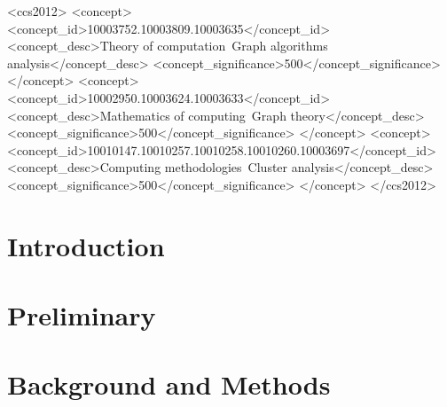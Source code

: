 \documentclass[sigconf,review]{acmart}
\begin{document}
\begin{CCSXML}
  <ccs2012>
  <concept>
  <concept_id>10003752.10003809.10003635</concept_id>
  <concept_desc>Theory of computation~Graph algorithms analysis</concept_desc>
  <concept_significance>500</concept_significance>
  </concept>
  <concept>
  <concept_id>10002950.10003624.10003633</concept_id>
  <concept_desc>Mathematics of computing~Graph theory</concept_desc>
  <concept_significance>500</concept_significance>
  </concept>
  <concept>
  <concept_id>10010147.10010257.10010258.10010260.10003697</concept_id>
  <concept_desc>Computing methodologies~Cluster analysis</concept_desc>
  <concept_significance>500</concept_significance>
  </concept>
  </ccs2012>
\end{CCSXML}




\maketitle

\section{Introduction}\label{sec:introduction}


\section{Preliminary}\label{sec:preliminary}


\section{Background and Methods}\label{sec:methods}

\end{document}
